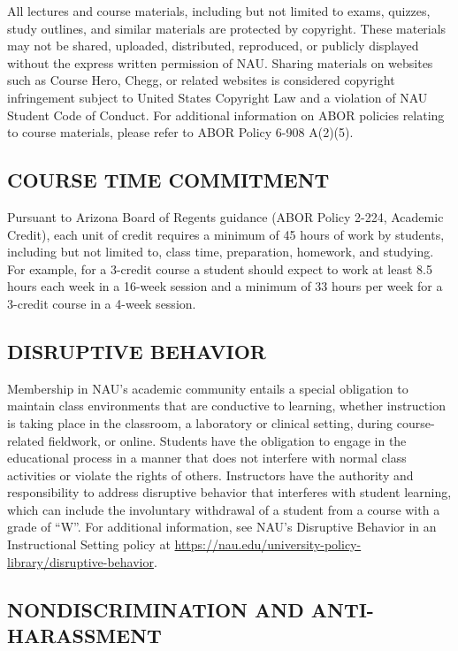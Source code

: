 \documentclass[
  letterpaper,
  DIV=11,
  numbers=noendperiod]{scrreprt}
\begin{document}
All lectures and course materials, including but not limited to exams,
quizzes, study outlines, and similar materials are protected by
copyright. These materials may not be shared, uploaded, distributed,
reproduced, or publicly displayed without the express written permission
of NAU. Sharing materials on websites such as Course Hero, Chegg, or
related websites is considered copyright infringement subject to United
States Copyright Law and a violation of NAU Student Code of Conduct. For
additional information on ABOR policies relating to course materials,
please refer to ABOR Policy 6-908 A(2)(5).

\hypertarget{course-time-commitment}{%
\subsection{COURSE TIME COMMITMENT}\label{course-time-commitment}}

Pursuant to Arizona Board of Regents guidance (ABOR Policy 2-224,
Academic Credit), each unit of credit requires a minimum of 45 hours of
work by students, including but not limited to, class time, preparation,
homework, and studying. For example, for a 3-credit course a student
should expect to work at least 8.5 hours each week in a 16-week session
and a minimum of 33 hours per week for a 3-credit course in a 4-week
session.

\hypertarget{disruptive-behavior}{%
\subsection{DISRUPTIVE BEHAVIOR}\label{disruptive-behavior}}

Membership in NAU's academic community entails a special obligation to
maintain class environments that are conductive to learning, whether
instruction is taking place in the classroom, a laboratory or clinical
setting, during course-related fieldwork, or online. Students have the
obligation to engage in the educational process in a manner that does
not interfere with normal class activities or violate the rights of
others. Instructors have the authority and responsibility to address
disruptive behavior that interferes with student learning, which can
include the involuntary withdrawal of a student from a course with a
grade of ``W''. For additional information, see NAU's Disruptive
Behavior in an Instructional Setting policy at
\url{https://nau.edu/university-policy-library/disruptive-behavior}.

\hypertarget{nondiscrimination-and-anti-harassment}{%
\subsection{NONDISCRIMINATION AND
ANTI-HARASSMENT}\label{nondiscrimination-and-anti-harassment}}
\end{document}
